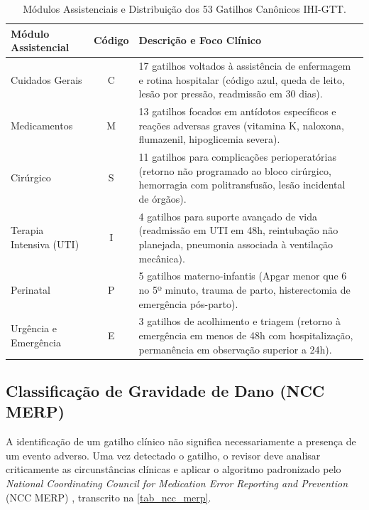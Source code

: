\begin{table}[htb]
\centering
\caption{Módulos Assistenciais e Distribuição dos 53 Gatilhos Canônicos IHI-GTT.}
\label{tab_modulos_gtt}
\begin{tabularx}{\textwidth}{l c X}
\toprule
\textbf{Módulo Assistencial} & \textbf{Código} & \textbf{Descrição e Foco Clínico} \\
\midrule
Cuidados Gerais & C & 17 gatilhos voltados à assistência de enfermagem e rotina hospitalar (código azul, queda de leito, lesão por pressão, readmissão em 30 dias). \\
Medicamentos & M & 13 gatilhos focados em antídotos específicos e reações adversas graves (vitamina K, naloxona, flumazenil, hipoglicemia severa). \\
Cirúrgico & S & 11 gatilhos para complicações perioperatórias (retorno não programado ao bloco cirúrgico, hemorragia com politransfusão, lesão incidental de órgãos). \\
Terapia Intensiva (UTI) & I & 4 gatilhos para suporte avançado de vida (readmissão em UTI em 48h, reintubação não planejada, pneumonia associada à ventilação mecânica). \\
Perinatal & P & 5 gatilhos materno-infantis (Apgar menor que 6 no 5º minuto, trauma de parto, histerectomia de emergência pós-parto). \\
Urgência e Emergência & E & 3 gatilhos de acolhimento e triagem (retorno à emergência em menos de 48h com hospitalização, permanência em observação superior a 24h). \\
\bottomrule
\end{tabularx}
\end{table}

\subsection{Classificação de Gravidade de Dano (NCC MERP)}
A identificação de um gatilho clínico não significa necessariamente a presença de um evento adverso. Uma vez detectado o gatilho, o revisor deve analisar criticamente as circunstâncias clínicas e aplicar o algoritmo padronizado pelo \textit{National Coordinating Council for Medication Error Reporting and Prevention} (NCC MERP) \cite{nccmerp2001}, transcrito na \autoref{tab_ncc_merp}.

